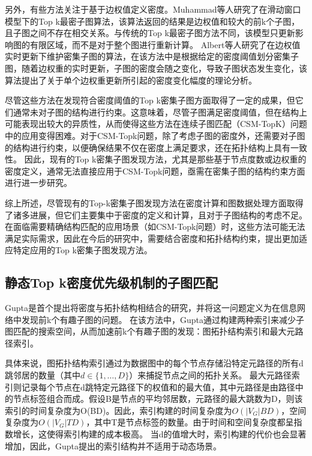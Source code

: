 另外，有些方法关注于基于边权值定义密度。Muhammad\cite{dsm-weight-Muhammad-DBLP:conf/cikm/NasirGMG17}等人研究了在滑动窗口模型下的Top k最密子图算法，该算法返回的结果是边权值和较大的前k个子图，且子图之间不存在相交关系。与传统的Top k最密子图方法不同，该模型只更新影响图的有限区域，而不是对于整个图进行重新计算。
Albert等人\cite{dsm-weight-Angel-DBLP:journals/vldb/AngelKSSST14}研究了在边权值实时更新下维护密集子图的算法，在该方法中是根据给定的密度阈值划分密集子图，随着边权重的实时更新，子图的密度会随之变化，导致子图状态发生变化，该算法提出了关于单个边权重更新所引起的密度变化幅度的理论分析。

尽管这些方法在发现符合密度阈值的Top k密集子图方面取得了一定的成果，但它们通常未对子图的结构进行约束。这意味着，尽管子图满足密度阈值，但在结构上可能表现出较大的异质性，从而使得这些方法在连续子图匹配（CSM-TopK）问题中的应用变得困难。对于CSM-Topk问题，除了考虑子图的密度外，还需要对子图的结构进行约束，以便确保结果不仅在密度上满足要求，还在拓扑结构上具有一致性。
因此，现有的Top k密集子图发现方法，尤其是那些基于节点度数或边权重的密度定义，通常无法直接应用于CSM-Topk问题，亟需在密集子图的结构约束方面进行进一步研究。

综上所述，尽管现有的Top-k密集子图发现方法在密度计算和图数据处理方面取得了诸多进展，但它们主要集中于密度的定义和计算，且对于子图结构的考虑不足。在面临需要精确结构匹配的应用场景（如CSM-Topk问题）时，这些方法可能无法满足实际需求，因此在今后的研究中，需要结合密度和拓扑结构约束，提出更加适应特定应用的Top k密集子图发现方法。

\subsection{静态Top k密度优先级机制的子图匹配}
Gupta\cite{static-topk-Gupta-DBLP:conf/icde/GuptaGYCH14}是首个提出将密度与拓扑结构相结合的研究，并将这一问题定义为在信息网络中发现前k个有趣子图的问题。
在该方法中，Gupta\cite{static-topk-Gupta-DBLP:conf/icde/GuptaGYCH14}通过构建两种索引来减少子图匹配的搜索空间，从而加速前k个有趣子图的发现：图拓扑结构索引和最大元路径索引。

具体来说，图拓扑结构索引通过为数据图中的每个节点存储沿特定元路径的所有d跳邻居的数量（其中$d \in \{1,\dots,D\}$）来捕捉节点之间的拓扑关系。
最大元路径索引则记录每个节点在d跳特定元路径下的权值和的最大值，其中元路径是由路径中的节点标签组合而成。假设B是节点的平均邻居数，元路径的最大跳数为D，则该索引的时间复杂度为O(BD)。因此，索引构建的时间复杂度为$O(|V_G|BD)$，空间复杂度为$O(|V_G|TD)$，其中T是节点标签的数量。由于时间和空间复杂度都呈指数增长，这使得索引构建的成本极高。
当d的值增大时，索引构建的代价也会显著增加，因此，Gupta提出的索引结构并不适用于动态场景。

